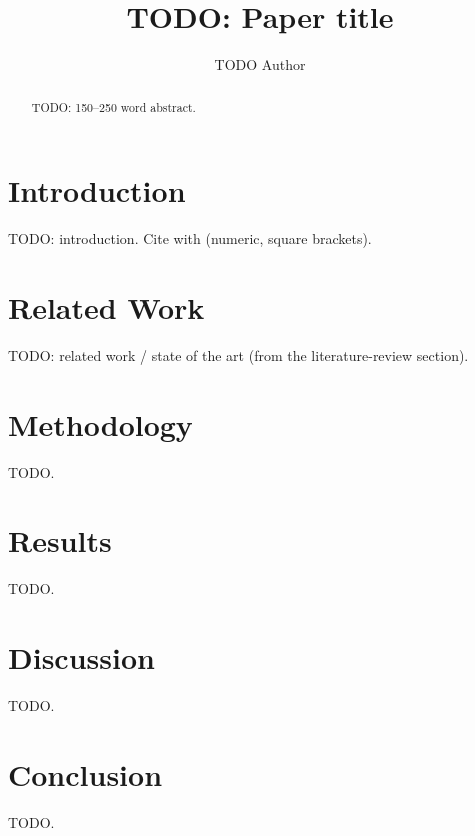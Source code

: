 \documentclass[runningheads]{llncs}
\begin{document}
\title{TODO: Paper title}
\author{TODO Author}

\maketitle

\begin{abstract}
TODO: 150--250 word abstract. %
\end{abstract}

\section{Introduction}
TODO: introduction. Cite with \cite{example2024} (numeric, square brackets).

\section{Related Work}
TODO: related work / state of the art (from the literature-review section).

\section{Methodology}
TODO.

\section{Results}
TODO.

\section{Discussion}
TODO.

\section{Conclusion}
TODO.



\end{document}
